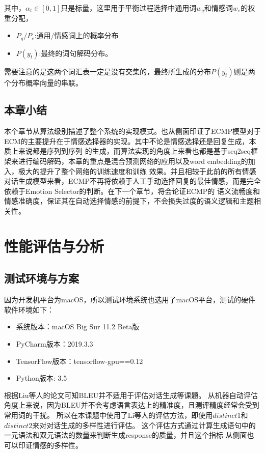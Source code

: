 \documentclass[supercite]{HustGraduPaper}
\theoremstyle{definition}
\begin{document}
其中，$\alpha_t \in [0,1]$只是标量，这里用于平衡过程选择中通用词$w_g$和情感词$w_e$的权重分配，
\begin{itemize}
  \item $P_g/P_e$:通用/情感词上的概率分布
  \item $P(y_t)$:最终的词句解码分布。
\end{itemize}
需要注意的是这两个词汇表一定是没有交集的，最终所生成的分布$P(y_t)$则是两个分布概率向量的串联。

\subsection{本章小结}
本个章节从算法级别描述了整个系统的实现模式。也从侧面印证了ECMP模型对于ECM的主要提升在于情感选择器的实现。其中不论是情感选择还是回复生成，本质上来说都是序列到序列
的生成，而算法实现的角度上来看也都是基于seq2seq框架来进行编码解码，本章的重点是混合预测网络的应用以及word embedding的加入，极大的提升了整个网络的训练速度和训练
效果。并且相较于此前的所有情感对话生成模型来看，ECMP不再将依赖于人工手动选择回复的最佳情感，而是完全依赖于Emotion Selector的判断。在下一个章节，将会论证ECMP的
语义流畅度和情感准确度，保证其在自动选择情感的前提下，不会损失过度的语义逻辑和主题相关性。

\section{性能评估与分析}
\subsection{测试环境与方案}
因为开发机平台为macOS，所以测试环境系统也选用了macOS平台，测试的硬件软件环境如下：
\begin{itemize}
  \item 系统版本：macOS Big Sur 11.2 Beta版
  \item PyCharm版本：2019.3.3
  \item TensorFlow版本：tensorflow-gpu==0.12
  \item Python版本: 3.5
\end{itemize}

根据Liu\cite{liu-etal-2016-evaluate}等人的论文可知BLEU并不适用于评估对话生成等课题。
从机器自动评估角度上来说，因为BLEU并不会考虑语言表达上的精准度，且测评精度经常会受到常用词的干扰。
所以在本课题中使用了Li\cite{li2015diversity}等人的评估方法，即使用$distinct 1$和$distinct 2$来对对话生成的多样性进行评估。
这个评估方式通过计算生成语句中的一元语法和双元语法的数量来判断生成response的质量，并且这个指标
从侧面也可以印证情感的多样性。
\end{document}
